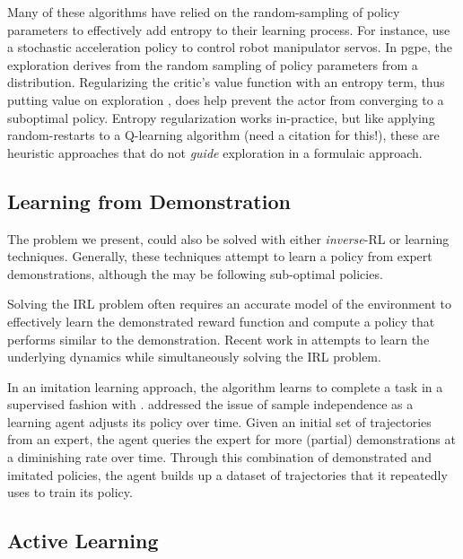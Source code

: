     Many of these algorithms have relied on the random-sampling of policy parameters to effectively add entropy to their
    learning process. For instance, \cite{peters2008reinforcement} use a stochastic acceleration policy to control robot
    manipulator servos. In \ac{pgpe}, the exploration derives from the random sampling of policy parameters from a
    distribution. Regularizing the critic's value function with an entropy term, thus putting value on exploration
    \cite{nachum2017bridging}, does help prevent the actor from converging to a suboptimal policy. Entropy
    regularization works in-practice, but like applying random-restarts to a Q-learning algorithm \color{blue}(need a
    citation for this!)\color{black}, these are heuristic approaches that do not \textit{guide} exploration in a
    formulaic approach.

\subsection{Learning from Demonstration}

    The problem we present, could also be solved with  either \textit{inverse}-\ac{RL} or  learning
    techniques.  Generally, these techniques attempt to learn a policy from expert demonstrations, although the
     may be following sub-optimal policies.

    Solving the IRL problem often requires an accurate model of the environment to effectively learn the demonstrated
    reward function and compute a policy that performs similar to the demonstration. Recent work in
    \cite{herman2016inverse} attempts to learn the underlying dynamics while simultaneously solving the IRL problem.

    In an imitation learning approach, the \DAGGER algorithm learns to complete a task in a supervised fashion with
    \cite{ross2011reduction}. \DAGGER addressed the issue of sample independence as a learning agent adjusts its policy
    over time.  Given an initial set of trajectories from an expert, the agent queries the expert for more (partial)
    demonstrations at a diminishing rate over time. Through this combination of demonstrated and imitated policies, the
    agent builds up a dataset of trajectories that it repeatedly uses to train its policy.

\subsection{Active Learning}

